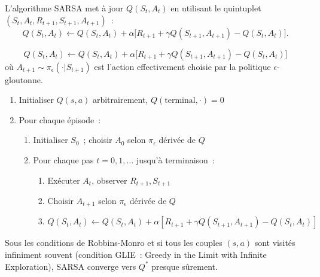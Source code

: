 \begin{definition}[SARSA]
L'algorithme SARSA met \`a jour $Q(S_t, A_t)$ en utilisant le quintuplet
$(S_t, A_t, R_{t+1}, S_{t+1}, A_{t+1})$~:
\[
    Q(S_t, A_t) \leftarrow Q(S_t, A_t) + \alpha \big[
    R_{t+1} + \gamma Q(S_{t+1}, A_{t+1}) - Q(S_t, A_t) \big].
\]
\end{definition}

\begin{formules}[title=\textbf{Mise \`a jour SARSA}]
\[
    Q(S_t, A_t) \leftarrow Q(S_t, A_t) + \alpha \big[
    R_{t+1} + \gamma Q(S_{t+1}, A_{t+1}) - Q(S_t, A_t) \big]
\]
o\`u $A_{t+1} \sim \pi_\epsilon(\cdot | S_{t+1})$ est l'action effectivement
choisie par la politique $\epsilon$-gloutonne.
\end{formules}

\begin{algorithme}[title=\textbf{SARSA}]
\begin{enumerate}
    \item Initialiser $Q(s,a)$ arbitrairement, $Q(\text{terminal}, \cdot) = 0$
    \item Pour chaque \'episode~:
    \begin{enumerate}
        \item Initialiser $S_0$~; choisir $A_0$ selon $\pi_\epsilon$ d\'eriv\'ee de $Q$
        \item Pour chaque pas $t = 0, 1, \ldots$ jusqu'\`a terminaison~:
        \begin{enumerate}
            \item Ex\'ecuter $A_t$, observer $R_{t+1}, S_{t+1}$
            \item Choisir $A_{t+1}$ selon $\pi_\epsilon$ d\'eriv\'ee de $Q$
            \item $Q(S_t, A_t) \leftarrow Q(S_t, A_t) + \alpha[R_{t+1} + \gamma Q(S_{t+1}, A_{t+1}) - Q(S_t, A_t)]$
        \end{enumerate}
    \end{enumerate}
\end{enumerate}
\end{algorithme}

\begin{theoreme}
Sous les conditions de Robbins-Monro et si tous les couples $(s,a)$ sont visit\'es
infiniment souvent (condition GLIE~: Greedy in the Limit with Infinite Exploration),
SARSA converge vers $Q^*$ presque s\^urement.
\end{theoreme}

